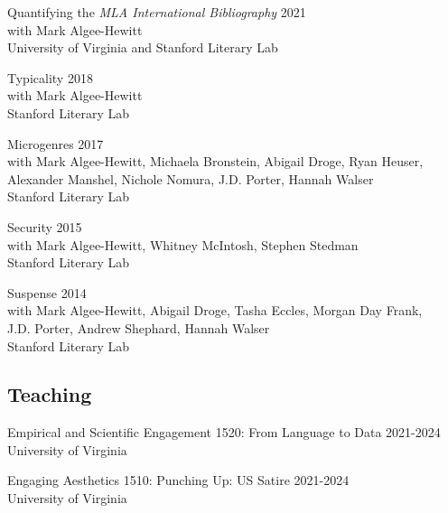 \documentclass[
  12pt,
  letterpaper,
]{article}
\begin{document}
Quantifying the \emph{MLA International Bibliography} \hfill 2021\\
\hspace*{0.333em} with Mark Algee-Hewitt\\
\hspace*{0.333em} University of Virginia and Stanford Literary Lab

Typicality \hfill 2018\\
\hspace*{0.333em} with Mark Algee-Hewitt\\
\hspace*{0.333em} Stanford Literary Lab

Microgenres \hfill 2017\\
\hspace*{0.333em} with Mark Algee-Hewitt, Michaela Bronstein, Abigail
Droge, Ryan Heuser,\\
\hspace*{0.333em} Alexander Manshel, Nichole Nomura, J.D. Porter, Hannah
Walser\\
\hspace*{0.333em} Stanford Literary Lab

Security \hfill 2015\\
\hspace*{0.333em} with Mark Algee-Hewitt, Whitney McIntosh, Stephen
Stedman\\
\hspace*{0.333em} Stanford Literary Lab

Suspense \hfill 2014\\
\hspace*{0.333em} with Mark Algee-Hewitt, Abigail Droge, Tasha Eccles,
Morgan Day Frank,\\
\hspace*{0.333em} J.D. Porter, Andrew Shephard, Hannah Walser\\
\hspace*{0.333em} Stanford Literary Lab

\hypertarget{teaching}{%
\subsection{Teaching}\label{teaching}}

Empirical and Scientific Engagement 1520: From Language to Data
\hfill 2021-2024\\
\hspace*{0.333em} University of Virginia

Engaging Aesthetics 1510: Punching Up: US Satire \hfill 2021-2024\\
\hspace*{0.333em} University of Virginia
\end{document}
